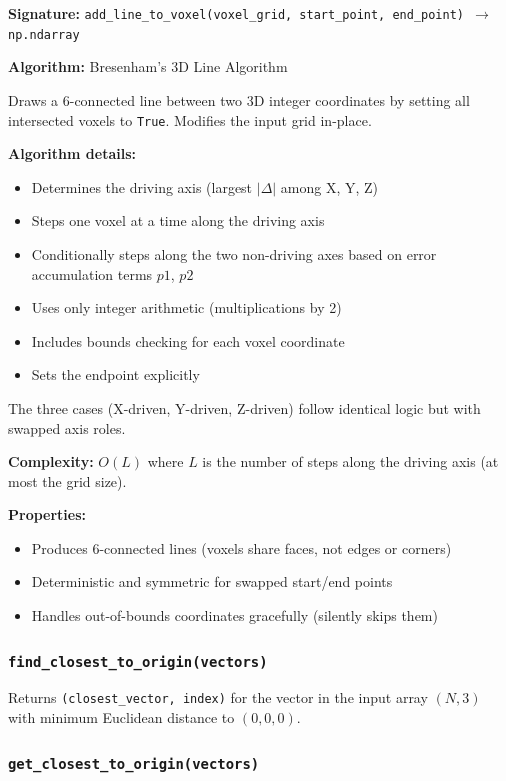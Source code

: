 \documentclass[12pt,a4paper]{article}
\begin{document}
\textbf{Signature:} \texttt{add\_line\_to\_voxel(voxel\_grid, start\_point, end\_point) $\rightarrow$ np.ndarray}

\textbf{Algorithm:} Bresenham's 3D Line Algorithm

Draws a 6-connected line between two 3D integer coordinates by setting all intersected voxels to \texttt{True}. Modifies the input grid in-place.

\textbf{Algorithm details:}
\begin{itemize}
  \item Determines the driving axis (largest $|\Delta|$ among X, Y, Z)
  \item Steps one voxel at a time along the driving axis
  \item Conditionally steps along the two non-driving axes based on error accumulation terms $p1$, $p2$
  \item Uses only integer arithmetic (multiplications by 2)
  \item Includes bounds checking for each voxel coordinate
  \item Sets the endpoint explicitly
\end{itemize}

The three cases (X-driven, Y-driven, Z-driven) follow identical logic but with swapped axis roles.

\textbf{Complexity:} $O(L)$ where $L$ is the number of steps along the driving axis (at most the grid size).

\textbf{Properties:}
\begin{itemize}
  \item Produces 6-connected lines (voxels share faces, not edges or corners)
  \item Deterministic and symmetric for swapped start/end points
  \item Handles out-of-bounds coordinates gracefully (silently skips them)
\end{itemize}

\subsubsection{\texttt{find\_closest\_to\_origin(vectors)}}

Returns \texttt{(closest\_vector, index)} for the vector in the input array $(N,3)$ with minimum Euclidean distance to $(0,0,0)$.

\subsubsection{\texttt{get\_closest\_to\_origin(vectors)}}
\end{document}

